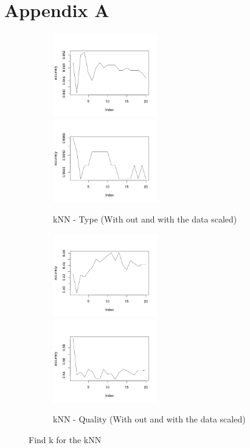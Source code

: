 \documentclass[twoside]{article}
\begin{document}
\section*{Appendix A}
\begin{figure}[H]
\centering
\begin{subfigure}[b]{\textwidth}
\includegraphics[width=0.5\textwidth]{img/KNN-Type(Not-Scaled).png}
\includegraphics[width=0.5\textwidth]{img/KNN-Type(Scaled).png}
\caption{kNN - Type (With out and with the data scaled)}
\label{fig:KNN-TYPE}
\end{subfigure}

\begin{subfigure}[b]{\textwidth}
\includegraphics[width=0.5\textwidth]{img/KNN-Quality(Not-Scaled).png}
\includegraphics[width=0.5\textwidth]{img/KNN-Quality(Scaled).png}
\caption{kNN - Quality (With out and with the data scaled)}
\label{fig:KNN-Quality}
\end{subfigure}
\caption{Find k for the kNN}
\end{figure}



\end{document}
